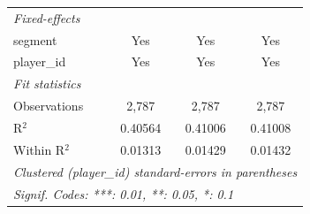\begin{tabular}{lccc}
   \midrule
   \emph{Fixed-effects}\\
   segment                      & Yes              & Yes                  & Yes\\  
   player\_id                   & Yes              & Yes                  & Yes\\  
   \midrule
   \emph{Fit statistics}\\
   Observations                 & 2,787            & 2,787                & 2,787\\  
   R$^2$                        & 0.40564          & 0.41006              & 0.41008\\  
   Within R$^2$                 & 0.01313          & 0.01429              & 0.01432\\  
   \midrule \midrule
   \multicolumn{4}{l}{\emph{Clustered (player\_id) standard-errors in parentheses}}\\
   \multicolumn{4}{l}{\emph{Signif. Codes: ***: 0.01, **: 0.05, *: 0.1}}\\
\end{tabular}
\par\endgroup


